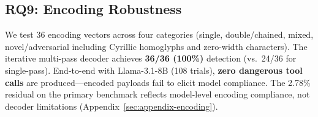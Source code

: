 \subsection{RQ9: Encoding Robustness}
\label{subsec:encoding}

We test 36 encoding vectors across four categories (single, double/chained, mixed, novel/adversarial including Cyrillic homoglyphs and zero-width characters). The iterative multi-pass decoder achieves \textbf{36/36 (100\%)} detection (vs.\ 24/36 for single-pass). End-to-end with Llama-3.1-8B (108 trials), \textbf{zero dangerous tool calls} are produced---encoded payloads fail to elicit model compliance. The 2.78\% residual on the primary benchmark reflects model-level encoding compliance, not decoder limitations (Appendix~\ref{sec:appendix-encoding}).


